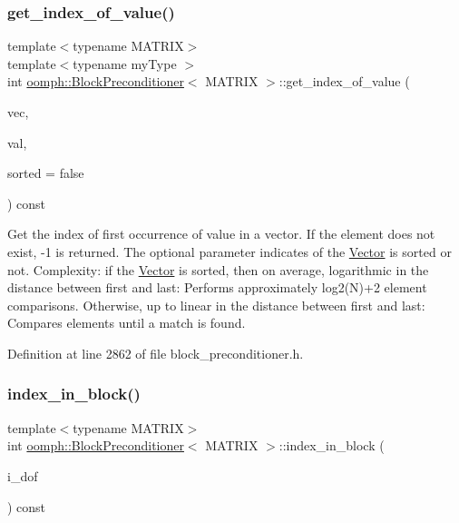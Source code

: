 \subsubsection{\texorpdfstring{get\+\_\+index\+\_\+of\+\_\+value()}{get\_index\_of\_value()}}
{\footnotesize\ttfamily template$<$typename M\+A\+T\+R\+IX$>$ \\
template$<$typename my\+Type $>$ \\
int \hyperlink{classoomph_1_1BlockPreconditioner}{oomph\+::\+Block\+Preconditioner}$<$ M\+A\+T\+R\+IX $>$\+::get\+\_\+index\+\_\+of\+\_\+value (\begin{DoxyParamCaption}\item[{const \hyperlink{classoomph_1_1Vector}{Vector}$<$ my\+Type $>$ \&}]{vec,  }\item[{const my\+Type}]{val,  }\item[{const bool}]{sorted = {\ttfamily false} }\end{DoxyParamCaption}) const\hspace{0.3cm}{\ttfamily [inline]}}



Get the index of first occurrence of value in a vector. If the element does not exist, -\/1 is returned. The optional parameter indicates of the \hyperlink{classoomph_1_1Vector}{Vector} is sorted or not. Complexity\+: if the \hyperlink{classoomph_1_1Vector}{Vector} is sorted, then on average, logarithmic in the distance between first and last\+: Performs approximately log2(\+N)+2 element comparisons. Otherwise, up to linear in the distance between first and last\+: Compares elements until a match is found. 



Definition at line 2862 of file block\+\_\+preconditioner.\+h.

\mbox{\label{classoomph_1_1BlockPreconditioner_a75742d54177935fb22e59d045209b11e}} 
\subsubsection{\texorpdfstring{index\+\_\+in\+\_\+block()}{index\_in\_block()}}
{\footnotesize\ttfamily template$<$typename M\+A\+T\+R\+IX$>$ \\
int \hyperlink{classoomph_1_1BlockPreconditioner}{oomph\+::\+Block\+Preconditioner}$<$ M\+A\+T\+R\+IX $>$\+::index\+\_\+in\+\_\+block (\begin{DoxyParamCaption}\item[{const unsigned \&}]{i\+\_\+dof }\end{DoxyParamCaption}) const\hspace{0.3cm}{\ttfamily [inline]}}



